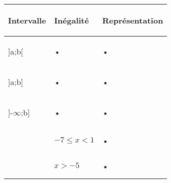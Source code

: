 \documentclass[a4paper,11pt]{article}
\begin{document}
\begin{tabular}{|p{3cm}|p{6cm}|p{7cm}|}
\hline 

 \begin{center}
 \textbf{Intervalle}
 \end{center}
  & \begin{center}
 \textbf{Inégalité}
 \end{center} & \begin{center}
\textbf{Représentation}
\end{center} \\ 
\hline 

 \begin{center}
 ]a;b[ 
 \end{center}& • & • \\ 
\hline 

\begin{center}
 ]a;b]
 \end{center} & • & • \\ 
\hline 
\begin{center}
 ]-$\infty$;b]
 \end{center} & • & • \\ 
\hline 
 & \begin{center}
 $-7\le x < 1$
 \end{center} & • \\ 
\hline 
  & \begin{center}
  $x>-5$
  \end{center} & • \\ 
\hline 


\end{tabular} 
\end{document}
